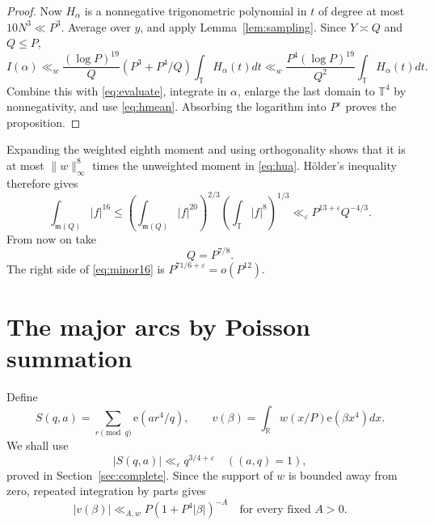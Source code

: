 \documentclass[11pt]{article}
\theoremstyle{remark}\newtheorem*{remark}{Remark}
\newcommand{\e}{\mathrm e}
\newcommand{\T}{\mathbb T}
\newcommand{\eps}{\varepsilon}
\newcommand{\m}{\mathfrak m}
\begin{document}
\begin{proof}
Now \(H_\alpha\) is a nonnegative trigonometric polynomial in \(t\)
of degree at most \(10N^3\ll P^3\). Average over \(y\), and apply
Lemma~\ref{lem:sampling}. Since \(Y\asymp Q\) and \(Q\le P\),
\[
 I(\alpha)\ll_w
 \frac{(\log P)^{19}}Q(P^3+P^4/Q)\int_\T H_\alpha(t)dt
 \ll_w\frac{P^4(\log P)^{19}}{Q^2}\int_\T H_\alpha(t)dt.
\]
Combine this with \eqref{eq:evaluate}, integrate in \(\alpha\), enlarge
the last domain to \(\T^4\) by nonnegativity, and use
\eqref{eq:hmean}. Absorbing the logarithm into \(P^\eps\) proves the
proposition.
\end{proof}

Expanding the weighted eighth moment and using orthogonality shows that
it is at most \(\|w\|_\infty^8\) times the unweighted moment in
\eqref{eq:hua}. H\"older's inequality therefore gives
\begin{equation}\label{eq:minor16}
 \int_{\m(Q)}|f|^{16}
 \le\left(\int_{\m(Q)}|f|^{20}\right)^{2/3}
     \left(\int_\T|f|^8\right)^{1/3}
 \ll_\eps P^{13+\eps}Q^{-4/3}.
\end{equation}
From now on take
\begin{equation}\label{eq:qchoice}
 Q=P^{7/8}.
\end{equation}
The right side of \eqref{eq:minor16} is \(P^{71/6+\eps}=o(P^{12})\).

\section{The major arcs by Poisson summation}

Define
\[
 S(q,a)=\sum_{r\pmod q}\e(ar^4/q),\qquad
 v(\beta)=\int_{\mathbb R}w(x/P)\e(\beta x^4)dx.
\]
We shall use
\begin{equation}\label{eq:completebound}
 |S(q,a)|\ll_\eps q^{3/4+\eps}\quad((a,q)=1),
\end{equation}
proved in Section~\ref{sec:complete}. Since the support of \(w\) is
bounded away from zero, repeated integration by parts gives
\begin{equation}\label{eq:vbound}
 |v(\beta)|\ll_{A,w}P(1+P^4|\beta|)^{-A}
 \quad\text{for every fixed }A>0.
\end{equation}
\end{document}
